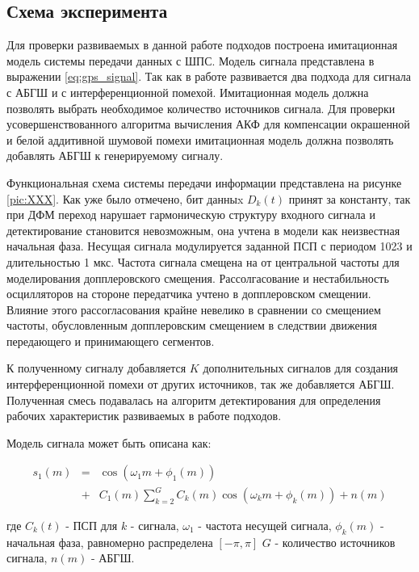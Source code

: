 \subsection{Схема эксперимента}
Для проверки развиваемых в данной работе подходов построена имитационная модель системы передачи данных с ШПС.
Модель сигнала представлена в выражении \ref{eq:gps_signal}. Так как в работе развивается два подхода для сигнала
с АБГШ и с интерференционной помехой. Имитационная модель должна позволять выбрать необходимое количество источников сигнала.
Для проверки усовершенствованного алгоритма вычисления АКФ для компенсации окрашенной и белой аддитивной шумовой помехи
имитационная модель должна позволять добавлять АБГШ к генерируемому сигналу. 

Функциональная схема системы передачи информации представлена на рисунке \ref{pic:XXX}. Как уже было отмечено, бит данныx ${D_k(t)}$
принят за константу, так при ДФМ переход нарушает гармоническую структуру входного сигнала и детектирование становится невозможным,
она учтена в модели как неизвестная начальная фаза. Несущая сигнала модулируется заданной ПСП с периодом 1023 и длительностью 1 мкс.
Частота сигнала смещена на от центральной частоты для моделирования допплеровского смещения. Рассолгасование и нестабильность
осцилляторов на стороне передатчика учтено в допплеровском смещении. Влияние этого рассогласования крайне невелико в сравнении
со смещением частоты, обусловленным допплеровским смещением в следствии движения передающего и принимающего сегментов.

К полученному сигналу добавляется ${K}$ дополнительных сигналов для создания интерференционной помехи от других источников,
так же добавляется АБГШ. Полученная смесь подавалась на алгоритм детектирования для определения рабочих характеристик развиваемых в работе подходов.

Модель сигнала может быть описана как:
\begin{center}
\begin{eqnarray}
	\label{eq:sec4_model}
	s_1(m)	& = & \cos(\omega_{1}m + \phi_1(m)) \nonumber \\
		& + & C_1(m) \sum \limits_{k=2}^{G}C_k(m)\cos(\omega_{k}m + \phi_k(m)) + n(m)
\end{eqnarray}
\end{center}
где ${C_k(t)}$ - ПСП для ${k}$ - сигнала, ${\omega_{1}}$ - частота несущей сигнала, ${\phi_k(m)}$ - начальная фаза, равномерно распределена ${[-\pi, \pi]}$
${G}$ - количество источников сигнала, ${n(m)}$ - АБГШ.

